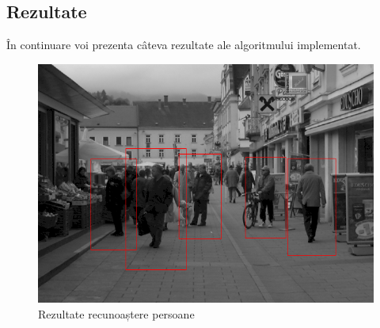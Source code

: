\subsection{Rezultate}
În continuare voi prezenta câteva rezultate ale algoritmului implementat.

\begin{figure}[H]
\begin{center}
	\includegraphics[width=1.00\textwidth]{imagini/rezultate_cu_nms.png}
\end{center}
	\caption{Rezultate recunoaștere persoane}
	\label{fig:rezultate_recunoaster_pers1}
\end{figure}

